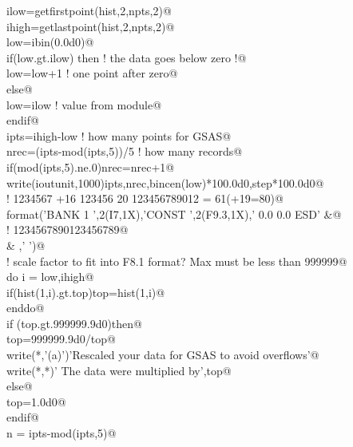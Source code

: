 \documentclass[10pt,a4paper,notitlepage]{article}
\begin{document}
\begin{flushleft}
\begin{minipage}{\linewidth}
\begin{list}{}{}
\mbox{}\verb@      ilow=getfirstpoint(hist,2,npts,2)@\\
\mbox{}\verb@      ihigh=getlastpoint(hist,2,npts,2)@\\
\mbox{}\verb@      low=ibin(0.0d0)@\\
\mbox{}\verb@      if(low.gt.ilow) then ! the data goes below zero !@\\
\mbox{}\verb@       low=low+1           ! one point after zero@\\
\mbox{}\verb@      else@\\
\mbox{}\verb@       low=ilow         ! value from module@\\
\mbox{}\verb@      endif@\\
\mbox{}\verb@      ipts=ihigh-low    ! how many points for GSAS@\\
\mbox{}\verb@      nrec=(ipts-mod(ipts,5))/5  ! how many records@\\
\mbox{}\verb@      if(mod(ipts,5).ne.0)nrec=nrec+1@\\
\mbox{}\verb@      write(ioutunit,1000)ipts,nrec,bincen(low)*100.0d0,step*100.0d0@\\
\mbox{}\verb@!             1234567   +16     123456    20         123456789012 = 61(+19=80)@\\
\mbox{}  format('BANK 1 ',2(I7,1X),'CONST ',2(F9.3,1X),' 0.0 0.0 ESD'      &@\\
\mbox{}\verb@!        1234567890123456789@\\
\mbox{}\verb@     & ,'                   ')@\\
\mbox{}\verb@! scale factor to fit into F8.1 format? Max must be less than 999999@\\
\mbox{}\verb@      do i = low,ihigh@\\
\mbox{}\verb@        if(hist(1,i).gt.top)top=hist(1,i)@\\
\mbox{}\verb@      enddo@\\
\mbox{}\verb@      if (top.gt.999999.9d0)then@\\
\mbox{}\verb@        top=999999.9d0/top@\\
\mbox{}\verb@        write(*,'(a)')'Rescaled your data for GSAS to avoid overflows'@\\
\mbox{}\verb@        write(*,*)'   The data were multiplied by',top@\\
\mbox{}\verb@      else@\\
\mbox{}\verb@        top=1.0d0@\\
\mbox{}\verb@      endif@\\
\mbox{}\verb@      n = ipts-mod(ipts,5)@\\

\end{list}
\end{minipage}
\end{flushleft}
\end{document}
